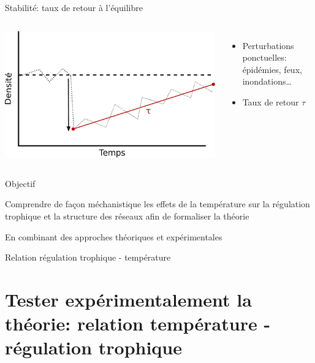 \documentclass[11pt, compress, aspectratio=1610]{beamer}
\providecommand{\tightlist}{%
  \setlength{\itemsep}{0pt}\setlength{\parskip}{0pt}}
\newcommand{\begincols}{\begin{columns}}
\newcommand{\stopcols}{\end{columns}}
\begin{document}
\begin{frame}{Stabilité: taux de retour à l'équilibre}

\begincols
{}

\centering
\includegraphics[width=1\linewidth]{figuresAz/stab.pdf}

\hfill{}

\begin{itemize}
\tightlist
\item
  Perturbations ponctuelles: épidémies, feux, inondations\ldots{}
\item
  Taux de retour \(\tau\)
\end{itemize}

\stopcols

\end{frame}

\begin{frame}{Objectif}

\centering
\Large{\textcolor{plST}{Comprendre de façon méchanistique les effets de la température sur la régulation trophique et la structure des réseaux afin de formaliser la théorie}}
\par

\large{En combinant des approches théoriques et expérimentales}

\end{frame}

\begin{frame}{Relation régulation trophique - température}



\end{frame}

\section{\texorpdfstring{Tester expérimentalement la \mbox{théorie:}
relation température - régulation
trophique}{Tester expérimentalement la  relation température - régulation trophique}}\label{tester-expuxe9rimentalement-la-relation-tempuxe9rature---ruxe9gulation-trophique}
\end{document}

